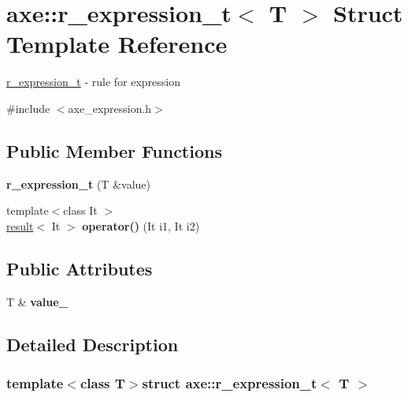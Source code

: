 \hypertarget{structaxe_1_1r__expression__t}{\section{axe\+:\+:r\+\_\+expression\+\_\+t$<$ T $>$ Struct Template Reference}
\label{structaxe_1_1r__expression__t}
}


\hyperlink{structaxe_1_1r__expression__t}{r\+\_\+expression\+\_\+t} -\/ rule for expression  




{\ttfamily \#include $<$axe\+\_\+expression.\+h$>$}

\subsection*{Public Member Functions}
\begin{DoxyCompactItemize}
\item 
\hypertarget{structaxe_1_1r__expression__t_a698f162e17b242a539133b8a42790933}{{\bfseries r\+\_\+expression\+\_\+t} (T \&value)}\label{structaxe_1_1r__expression__t_a698f162e17b242a539133b8a42790933}

\item 
\hypertarget{structaxe_1_1r__expression__t_a7eee4af00d09f65794d77e652364e4aa}{{\footnotesize template$<$class It $>$ }\\\hyperlink{structaxe_1_1result}{result}$<$ It $>$ {\bfseries operator()} (It i1, It i2)}\label{structaxe_1_1r__expression__t_a7eee4af00d09f65794d77e652364e4aa}

\end{DoxyCompactItemize}
\subsection*{Public Attributes}
\begin{DoxyCompactItemize}
\item 
\hypertarget{structaxe_1_1r__expression__t_abdd3ea738bfaae1c1be253811a1b1db7}{T \& {\bfseries value\+\_\+}}\label{structaxe_1_1r__expression__t_abdd3ea738bfaae1c1be253811a1b1db7}

\end{DoxyCompactItemize}


\subsection{Detailed Description}
\subsubsection*{template$<$class T$>$struct axe\+::r\+\_\+expression\+\_\+t$<$ T $>$}

